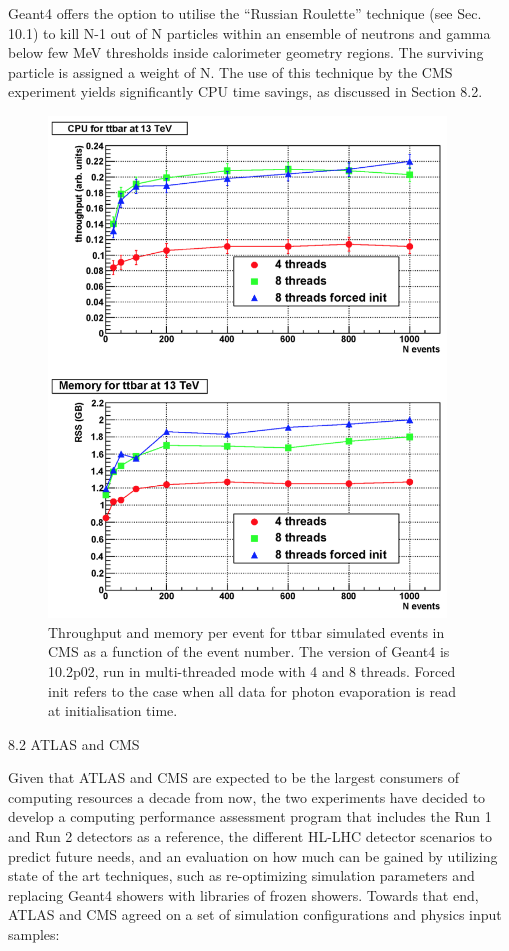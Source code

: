 \documentclass[12pt,a4paper]{article}
\begin{document}
{Geant4 offers the option to utilise the ``Russian Roulette'' technique
(see Sec. 10.1) to kill N-1 out of N particles within an ensemble of
neutrons and gamma below few MeV thresholds inside calorimeter geometry
regions. The surviving particle is assigned a weight of N. The use of
this technique by the CMS experiment yields significantly CPU time
savings, as discussed in Section 8.2.


\begin{figure}[bthp]
\vspace*{0.3cm}
\centering
\includegraphics[width=0.94\textwidth]{image14.png}
\caption{Throughput and memory per event for ttbar simulated
events in CMS as a function of the event number. The version of Geant4
is 10.2p02, run in multi-threaded mode with 4 and 8 threads. Forced init
refers to the case when all data for photon evaporation is read at
initialisation time.}
\label{fig:perfthroughput}
\end{figure}

8.2 ATLAS and CMS

Given that ATLAS and CMS are expected to be the largest consumers of
computing resources a decade from now, the two experiments have decided
to develop a computing performance assessment program that includes the
Run 1 and Run 2 detectors as a reference, the different HL-LHC detector
scenarios to predict future needs, and an evaluation on how much can be
gained by utilizing state of the art techniques, such as re-optimizing
simulation parameters and replacing Geant4 showers with libraries of
frozen showers. Towards that end, ATLAS and CMS agreed on a set of
simulation configurations and physics input samples:

}
\end{document}
